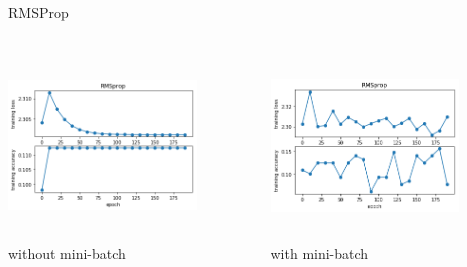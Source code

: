 \documentclass{beamer}
\begin{document}
\begin{frame}{RMSProp}
 \begin{columns}
    \begin{column}{0.47\textwidth}
          \includegraphics[width=5cm,height=5cm,angle=0]{rms_mini.png}\\
          \centering
          without mini-batch
    \end{column}
    \begin{column}{0.47\textwidth}
          \includegraphics[width=5cm,height=5cm,angle=0]{rms.png}\\
          \centering
          with mini-batch
    \end{column}
 \end{columns}
\end{frame}
\end{document}
